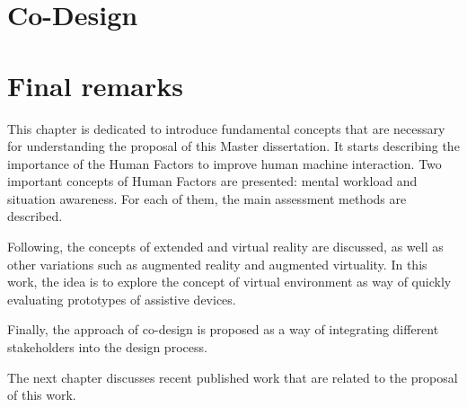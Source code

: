         

\section{Co-Design}
\label{sec:co_design}

    

\section{Final remarks}
\label{sec:final_remarks2}


This chapter is dedicated to introduce fundamental concepts that are necessary for understanding the proposal of this Master dissertation. 
It starts describing the importance of the Human Factors to improve human machine interaction. Two important concepts of Human Factors are presented: mental workload and situation awareness. For each of them, the main assessment methods are described.

Following, the concepts of extended and virtual reality are discussed, as well as other variations such as augmented reality and augmented virtuality. In this work, the idea is to explore the concept of virtual environment as way of quickly evaluating prototypes of assistive devices. 

Finally, the approach of co-design is proposed as a way of integrating different stakeholders into the design process. 

The next chapter discusses recent published work that are related to the proposal of this work.
